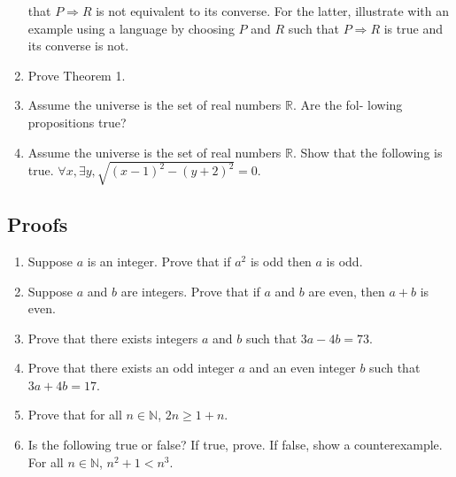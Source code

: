 \documentclass[10pt]{article}
\renewcommand{\textit}{}
\begin{document}
\begin{enumerate}
{    that $P \Rightarrow R$ is not equivalent to its converse. For the
    latter, illustrate with an example using a language by choosing
    $P$ and $R$ such that $P \Rightarrow R$ is true and its
    converse is not.} 
\item \textit{Prove Theorem 1.}
\item \textit{Assume the universe is the set of real numbers
    $\mathbb{R}$. Are the fol- lowing propositions true?}
\item \textit{Assume the universe is the set of real numbers
    $\mathbb{R}$. Show that the following is true. $\forall x, \exists
    y, \sqrt{(x − 1)^2 − (y + 2)^2} = 0$.}
  \setcounter{savedcount}{\value{enumi}}
\end{enumerate}

\subsection{Proofs}

\begin{enumerate}
  \setcounter{enumi}{\value{savedcount}}
\item \textit{Suppose $a$ is an integer. Prove that if $a^2$ is odd then
    $a$ is odd.} 
\item \textit{Suppose $a$ and $b$ are integers. Prove that if $a$ and
    $b$ are even, then $a + b$ is even.} 
\item \textit{Prove that there exists integers $a$ and $b$ such that
    $3a−4b = 73$.} 
\item\textit{Prove that there exists an odd integer $a$ and an even
    integer $b$ such that $3a + 4b = 17$.} 
\item \textit{Prove that for all $n \in \mathbb{N}$, $2n \geq 1 + n$.} 
\item \textit{Is the following true or false? If true, prove. If
    false, show a  counterexample. For all $n \in \mathbb{N}$, $n^2 +
    1 < n^3$}. 
\end{enumerate}
\end{document}

